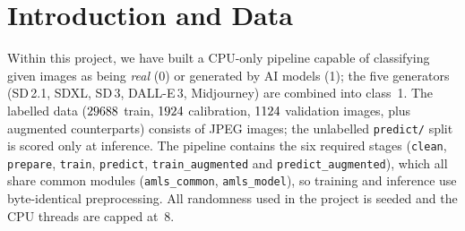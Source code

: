 \section{Introduction and Data}
Within this project, we have built a CPU-only pipeline capable of classifying
given images as being \emph{real} (0) or generated by AI models (1); the five
generators (SD\,2.1, SDXL, SD\,3, DALL-E\,3, Midjourney) are combined into
class~1. The labelled data ($29688$ train, $1924$ calibration, $1124$
validation images, plus augmented counterparts) consists of JPEG images; the
unlabelled \texttt{predict/} split is scored only at inference. The pipeline
contains the six required stages (\texttt{clean}, \texttt{prepare},
\texttt{train}, \texttt{predict}, \texttt{train\_augmented} and
\texttt{predict\_augmented}), which all share common modules
(\texttt{amls\_common}, \texttt{amls\_model}), so training and inference use
byte-identical preprocessing. All randomness used in the project is seeded and
the CPU threads are capped at~8.
